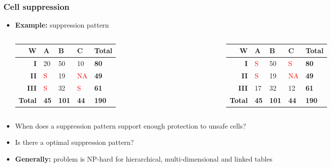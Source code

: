\begin{frame}\frametitle{Cell suppression}
	\begin{itemize}
		\item {\bf Example:} suppression pattern \pause
		\begin{columns}
		\begin{column}{5cm}
			\begin{center}
				\begin{tabular}{|r|lll|l|}
				\hline
				{\bf W} & {\bf A} & {\bf B} & {\bf C} & {\bf Total} \\
				\hline
				{\bf I} 	& 20 & 50 & 10 & {\bf 80} \\
				{\bf II} 	& \textcolor{red}{S} & 19 & \textcolor{red}{NA} & {\bf 49} \\
				{\bf III} & \textcolor{red}{S} & 32 & \textcolor{red}{S} & {\bf 61} \\
				\hline
				{\bf Total} & {\bf 45} & {\bf 101} & {\bf 44} & {\bf 190} \\
				\hline
				\end{tabular}
			\end{center}
		\end{column}
		\pause
			\begin{column}{5cm}
			\begin{center}
				\begin{tabular}{|r|lll|l|}
				\hline
				{\bf W} & {\bf A} & {\bf B} & {\bf C} & {\bf Total} \\
				\hline
				{\bf I} 	& \textcolor{red}{S} & 50 & \textcolor{red}{S} & {\bf 80} \\
				{\bf II} 	& \textcolor{red}{S} & 19 & \textcolor{red}{NA} & {\bf 49} \\
				{\bf III} & 17 & 32 & 12 & {\bf 61} \\
				\hline
				{\bf Total} & {\bf 45} & {\bf 101} & {\bf 44} & {\bf 190} \\
				\hline
				\end{tabular}
			\end{center}
			\end{column}
		\end{columns}
		\pause
		\item When does a suppression pattern support enough protection to unsafe cells? \pause
		\item Is there a optimal suppression pattern? \pause
		\item {\bf Generally:} problem is NP-hard for hierarchical, multi-dimensional and linked tables
	\end{itemize}
\end{frame}


